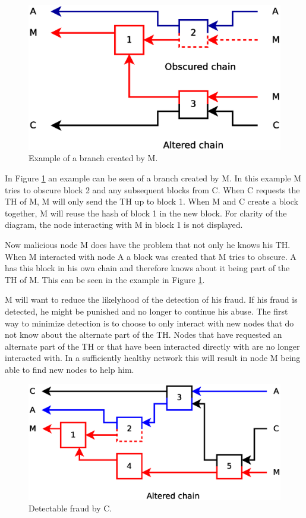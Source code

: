\begin{figure}
	\centerline{\includegraphics[scale=0.3]{problems/figs/branch.eps}}
	\caption{Example of a branch created by M.}
	\label{fig:problem-branch-obscure}
\end{figure}

In Figure \ref{fig:problem-branch-obscure} an example can be seen of a branch created by M.
In this example M tries to obscure block 2 and any subsequent blocks from C.
When C requests the TH of M, M will only send the TH up to block 1.
When M and C create a block together,
M will reuse the hash of block 1 in the new block.
For clarity of the diagram, the node interacting with M in block 1 is not displayed.

Now malicious node M does have the problem that not only he knows his TH.
When M interacted with node A a block was created that M tries to obscure.
A has this block in his own chain
and therefore knows about it being part of the TH of M.
This can be seen in the example in Figure \ref{fig:problem-branch-obscure}.

M will want to reduce the likelyhood of the detection of his fraud.
If his fraud is detected, he might be punished and no longer to continue his abuse.
The first way to minimize detection is to choose
to only interact with new nodes that do not know about the alternate part of the TH.
Nodes that have requested an alternate part of the TH
or that have been interacted directly with are no longer interacted with.
In a sufficiently healthy network this will result in node M being able to find new nodes to help him.

\begin{figure}
	\centerline{\includegraphics[scale=0.3]{problems/figs/branch-fraud-detected.eps}}
	\caption{Detectable fraud by C.}
	\label{fig:problem-branch-preknowledge}
\end{figure}


